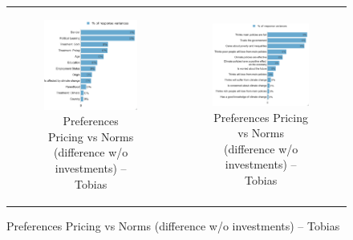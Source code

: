 \documentclass{article}
\begin{document}
\begin{figure}[h!]
\begin{center}
	\caption{Variance decomposition LMG}
	\setlength\extrarowheight{-1pt}
	\begin{tabular}{cc}
		\begin{subfigure}{0.5\textwidth}
		\caption{Preferences Pricing vs Norms (difference w/o investments) -- Tobias}
			\includegraphics[width=\textwidth]{lmg_pref_pricing_norms_diff_V1_socio_non_standardized}
		\end{subfigure}&
		\begin{subfigure}{0.5\textwidth}
		\caption{Preferences Pricing vs Norms (difference w/o investments) -- Tobias}
			\includegraphics[width=\textwidth]{lmg_pref_pricing_norms_diff_V1_indices_non_standardized}
		\end{subfigure}\\
	\end{tabular}


\end{center}
\end{figure}
\end{document}
